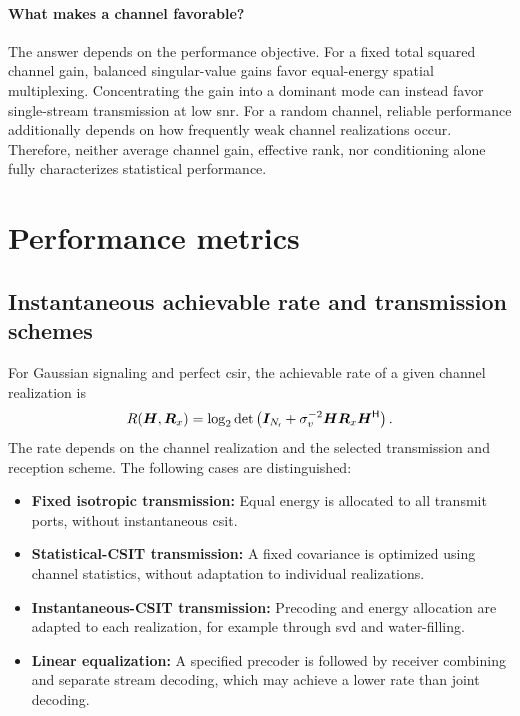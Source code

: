 \paragraph{What makes a channel favorable?}
The answer depends on the performance objective.
%
For a fixed total squared channel gain,
balanced singular-value gains favor
equal-energy spatial multiplexing.
Concentrating the gain into a dominant mode
can instead favor single-stream transmission
at low \ac{snr}.
%
For a random channel, reliable performance
additionally depends on how frequently weak
channel realizations occur.
Therefore, neither average channel gain,
effective rank, nor conditioning alone
fully characterizes statistical performance.



\section{Performance metrics}
\label{sec:metrics}

\subsection{Instantaneous achievable rate and transmission schemes}

For Gaussian signaling and perfect \ac{csir}, the achievable rate of a given channel realization is
\begin{equation}\label{eq:instant}
	R(\bm{H},\bm{R}_x)
	=\log_2\operatorname{det}\left(\bm{I}_{N_{\mathsf{r}}}
		+\sigma_v^{-2}\bm{H}\bm{R}_x{\bm{H}}^{\mathsf{H}}\right).
\end{equation}
The rate depends on the channel realization and the selected transmission and reception scheme. The following cases are distinguished:

\begin{itemize}
	\item \textbf{Fixed isotropic transmission:} Equal energy is allocated to all transmit ports, without instantaneous \ac{csit}.
	\item \textbf{Statistical-CSIT transmission:} A fixed covariance is optimized using channel statistics, without adaptation to individual realizations.
	\item \textbf{Instantaneous-CSIT transmission:} Precoding and energy allocation are adapted to each realization, for example through \ac{svd} and water-filling.
	\item \textbf{Linear equalization:} A specified precoder is followed by receiver combining and separate stream decoding, which may achieve a lower rate than joint decoding.
\end{itemize}

